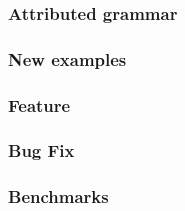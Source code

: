 \subsubsection{Attributed grammar}


\subsubsection{New examples}




\subsubsection{Feature}

\subsubsection{Bug Fix}

\subsubsection{Benchmarks}

